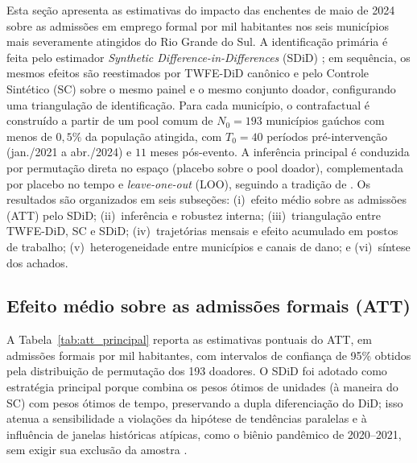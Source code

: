 \documentclass[a4paper,12pt]{article}
\begin{document}
Esta seção apresenta as estimativas do impacto das enchentes de maio de 2024
sobre as admissões em emprego formal por mil habitantes nos seis municípios
mais severamente atingidos do Rio Grande do Sul. A identificação primária é
feita pelo estimador \textit{Synthetic Difference-in-Differences} (SDiD)
\cite{arkhangelsky2021}; em sequência, os mesmos efeitos são reestimados por
TWFE-DiD canônico e pelo Controle Sintético (SC) sobre o mesmo painel e o
mesmo conjunto doador, configurando uma triangulação de identificação. Para
cada município, o contrafactual é construído a partir de um pool comum de
$N_0 = 193$ municípios gaúchos com menos de $0{,}5\%$ da população atingida,
com $T_0 = 40$ períodos
pré-intervenção (jan./2021 a abr./2024) e $11$ meses pós-evento. A inferência
principal é conduzida por permutação direta no espaço (placebo sobre o pool
doador), complementada por placebo no tempo e \textit{leave-one-out} (LOO),
seguindo a tradição de . Os resultados são
organizados em seis subseções: (i)~efeito médio sobre as admissões (ATT) pelo
SDiD; (ii)~inferência e robustez interna; (iii)~triangulação entre TWFE-DiD,
SC e SDiD; (iv)~trajetórias mensais e efeito acumulado em postos de trabalho;
(v)~heterogeneidade entre municípios e canais de dano; e (vi)~síntese dos
achados.

\subsection{Efeito médio sobre as admissões formais (ATT)}
\label{sub:att}

A Tabela~\ref{tab:att_principal} reporta as estimativas pontuais do ATT, em
admissões formais por mil habitantes, com intervalos de confiança de 95\%
obtidos pela distribuição de permutação dos 193 doadores. O SDiD foi adotado
como estratégia principal porque combina os pesos ótimos de unidades (à
maneira do SC) com pesos ótimos de tempo, preservando a dupla diferenciação
do DiD; isso atenua a sensibilidade a violações da hipótese de tendências
paralelas e à influência de janelas históricas atípicas, como o biênio
pandêmico de 2020--2021, sem exigir sua exclusão da amostra
\cite{arkhangelsky2021, clarke2023}.
\end{document}
